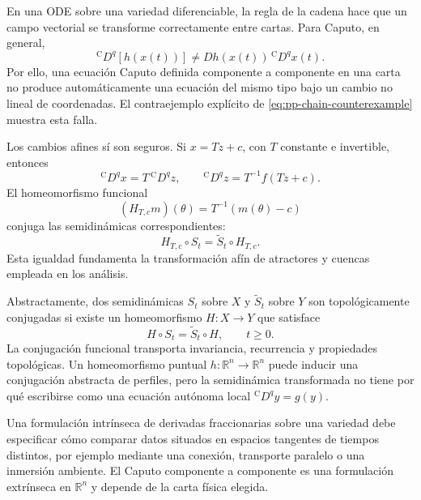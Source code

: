 En una ODE sobre una variedad diferenciable, la regla de la cadena hace que un
campo vectorial se transforme correctamente entre cartas. Para Caputo, en
general,
\begin{equation}
 {}^{\mathrm C}D^q[h(x(t))]
 \neq Dh(x(t))\,{}^{\mathrm C}D^qx(t).
 \label{eq:geofo-no-chain-rule}
\end{equation}
Por ello, una ecuación Caputo definida componente a componente en una carta no
produce automáticamente una ecuación del mismo tipo bajo un cambio no lineal
de coordenadas. El contraejemplo explícito de
\cref{eq:pp-chain-counterexample} muestra esta falla.

Los cambios afines sí son seguros. Si \(x=Tz+c\), con \(T\) constante e
invertible, entonces
\begin{equation}
 {}^{\mathrm C}D^qx=T\,{}^{\mathrm C}D^qz,
 \qquad
 {}^{\mathrm C}D^qz=T^{-1}f(Tz+c).
 \label{eq:geofo-affine-transform}
\end{equation}
El homeomorfismo funcional
\begin{equation}
 (H_{T,c}m)(\theta)=T^{-1}(m(\theta)-c)
 \label{eq:geofo-affine-history-map}
\end{equation}
conjuga las semidinámicas correspondientes:
\begin{equation}
 H_{T,c}\circ S_t=\widetilde S_t\circ H_{T,c}.
 \label{eq:geofo-affine-conjugacy}
\end{equation}
Esta igualdad fundamenta la transformación afín de atractores y cuencas
empleada en los análisis.

Abstractamente, dos semidinámicas \(S_t\) sobre \(X\) y \(\widetilde S_t\)
sobre \(Y\) son topológicamente conjugadas si existe un homeomorfismo
\(H:X\to Y\) que satisface
\begin{equation}
 H\circ S_t=\widetilde S_t\circ H,
 \qquad t\geq0.
 \label{eq:geofo-topological-conjugacy}
\end{equation}
La conjugación funcional transporta invariancia, recurrencia y propiedades
topológicas. Un homeomorfismo puntual
\(h:\mathbb R^n\to\mathbb R^n\) puede inducir una conjugación abstracta de
perfiles, pero la semidinámica transformada no tiene por qué escribirse como
una ecuación autónoma local \({}^{\mathrm C}D^qy=g(y)\).

\begin{remark}
Una formulación intrínseca de derivadas fraccionarias sobre una variedad debe
especificar cómo comparar datos situados en espacios tangentes de tiempos
distintos, por ejemplo mediante una conexión, transporte paralelo o una
inmersión ambiente. El Caputo componente a componente es una formulación
extrínseca en \(\mathbb R^n\) y depende de la carta física elegida.
\end{remark}

